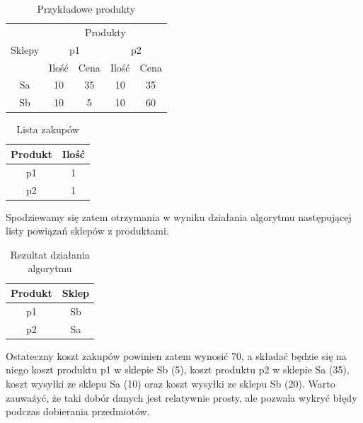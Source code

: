 \documentclass[a4paper]{article}
\begin{document}
\begin{table}[H]
\renewcommand{\arraystretch}{1.3}
\centering
\caption{Przykładowe produkty}
\begin{tabular}{|c|c|c|c|c|}
\hline
\multirow{3}{*}{Sklepy} & \multicolumn{4}{c|}{Produkty}                     \\ \cline{2-5} 
                        & \multicolumn{2}{c|}{p1} & \multicolumn{2}{c|}{p2} \\ \cline{2-5} 
                        & Ilość       & Cena      & Ilość       & Cena      \\ \hline
Sa                      & 10          & 35        & 10          & 35        \\ \hline
Sb                      & 10          & 5         & 10          & 60        \\ \hline
\end{tabular}
\end{table}

\begin{table}[H]
\renewcommand{\arraystretch}{1.3}
\centering
\caption{Lista zakupów}
\begin{tabular}{|c|c|}
\hline
Produkt & Ilość \\ \hline
p1      & 1     \\ \hline
p2      & 1     \\ \hline
\end{tabular}
\end{table}

Spodziewamy się zatem otrzymania w wyniku działania algorytmu następującej listy powiązań sklepów z produktami.

\begin{table}[H]
\renewcommand{\arraystretch}{1.3}
\centering
\caption{Rezultat działania algorytmu}
\begin{tabular}{|c|c|}
\hline
Produkt & Sklep \\ \hline
p1      & Sb    \\ \hline
p2      & Sa    \\ \hline
\end{tabular}
\end{table}

Ostateczny koszt zakupów powinien zatem wynosić 70, a składać będzie się na niego koszt produktu p1 w sklepie Sb (5), koszt produktu p2 w sklepie Sa (35), koszt wysyłki ze sklepu Sa (10) oraz koszt wysyłki ze sklepu Sb (20). Warto zauważyć, że taki dobór danych jest relatywnie prosty, ale pozwala wykryć błędy podczas dobierania przedmiotów.
\end{document}
